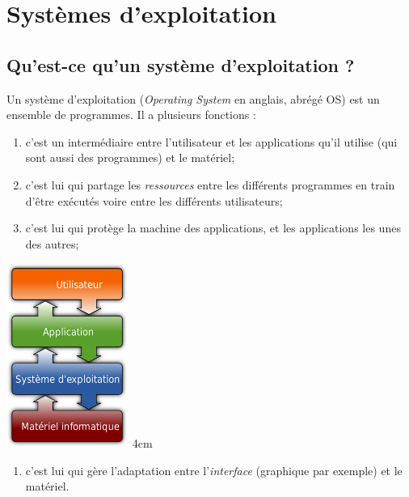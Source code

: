 \documentclass[a5paper,12pt,french,landscape]{book}
\begin{document}
	\chapter*{Systèmes d'exploitation}

	\section*{Qu'est-ce qu'un système d'exploitation ?}
	
	\double
	{
		Un système d'exploitation (\textit{Operating System} en anglais, abrégé OS) est un ensemble de programmes. Il a plusieurs fonctions :
		\begin{enumerate}[--]
			\item 	c'est un intermédiaire entre l'utilisateur et les applications qu'il utilise (qui sont aussi des programmes) et le matériel;
			\item 	c'est lui qui partage les \textit{ressources} entre les différents programmes en train d'être exécutés voire entre les différents utilisateurs;
			\item 	c'est lui qui protège la machine des applications, et les applications les unes des autres;
		\end{enumerate}
	}
	{
		\includegraphics[width=4cm]{sysex.png}
	}
	{4cm}
	\begin{enumerate}[--]
		\item 	c'est lui qui gère l'adaptation entre l'\textit{interface} (graphique par exemple) et le matériel.
	\end{enumerate}
		
\end{document}
